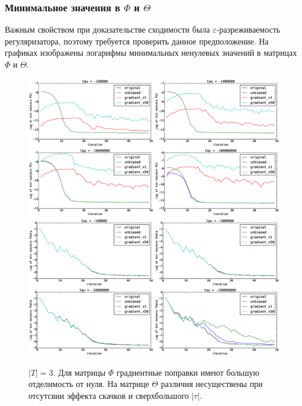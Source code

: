 \documentclass[12pt]{article}
\begin{document}
\subsubsection{Минимальное значения в $\Phi$ и $\Theta$}
Важным свойством при доказательстве сходимости была $\varepsilon$-разреживаемость регуляризатора, поэтому требуется проверить данное предположение. На графиках изображены логарифмы минимальных ненулевых значений в матрицах $\Phi$ и $\Theta$.
\begin{figure}[H]
	\centering
	\caption{$|T| = 3$. Для матрицы $\Phi$ градиентные поправки имеют большую отделимость от нуля. На матрице $\Theta$ различия несуществены при отсутсвии эффекта скачков и сверхбольшого $|\tau|$.}    
	\includegraphics[width=1.0\linewidth]{pictures/topics_3_minPhi_values}
	\includegraphics[width=1.0\linewidth]{pictures/topics_3_minTheta_values}
\end{figure}
\end{document}
